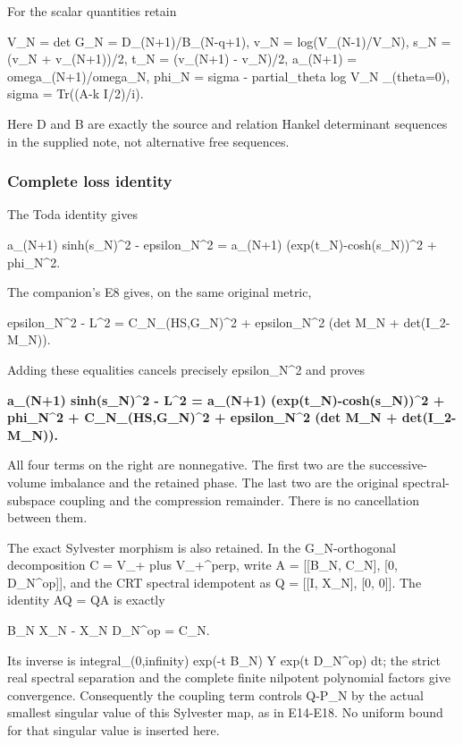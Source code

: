 For the scalar quantities retain

V\_N = det G\_N = D\_(N+1)/B\_(N-q+1), v\_N = log(V\_(N-1)/V\_N), s\_N = (v\_N + v\_(N+1))/2, t\_N =
(v\_(N+1) - v\_N)/2, a\_(N+1) = omega\_(N+1)/omega\_N, phi\_N = sigma - partial\_theta log V\_N
\textbar\_(theta=0), sigma = Tr((A-k I/2)/i).

Here D and B are exactly the source and relation Hankel determinant sequences in the supplied note,
not alternative free sequences.

\subsubsection{Complete loss identity}\label{toda_parent_join:complete-loss-identity}

The Toda identity gives

a\_(N+1) sinh(s\_N)\^{}2 - epsilon\_N\^{}2 = a\_(N+1) (exp(t\_N)-cosh(s\_N))\^{}2 + phi\_N\^{}2.

The companion's E8 gives, on the same original metric,

epsilon\_N\^{}2 - L\^{}2 = \textbar\textbar C\_N\textbar\textbar\_(HS,G\_N)\^{}2 + epsilon\_N\^{}2
(det M\_N + det(I\_2-M\_N)).

Adding these equalities cancels precisely epsilon\_N\^{}2 and proves

\textbf{a\_(N+1) sinh(s\_N)\^{}2 - L\^{}2 = a\_(N+1) (exp(t\_N)-cosh(s\_N))\^{}2 + phi\_N\^{}2 +
\textbar\textbar C\_N\textbar\textbar\_(HS,G\_N)\^{}2 + epsilon\_N\^{}2 (det M\_N +
det(I\_2-M\_N)).}

All four terms on the right are nonnegative. The first two are the successive-volume imbalance and
the retained phase. The last two are the original spectral-subspace coupling and the compression
remainder. There is no cancellation between them.

The exact Sylvester morphism is also retained. In the G\_N-orthogonal decomposition C = V\_+ plus
V\_+\^{}perp, write A = {[}{[}B\_N, C\_N{]}, {[}0, D\_N\^{}op{]}{]}, and the CRT spectral idempotent
as Q = {[}{[}I, X\_N{]}, {[}0, 0{]}{]}. The identity AQ = QA is exactly

B\_N X\_N - X\_N D\_N\^{}op = C\_N.

Its inverse is integral\_(0,infinity) exp(-t B\_N) Y exp(t D\_N\^{}op) dt; the strict real spectral
separation and the complete finite nilpotent polynomial factors give convergence. Consequently the
coupling term controls \textbar\textbar Q-P\_N\textbar\textbar{} by the actual smallest singular
value of this Sylvester map, as in E14-E18. No uniform bound for that singular value is inserted
here.

